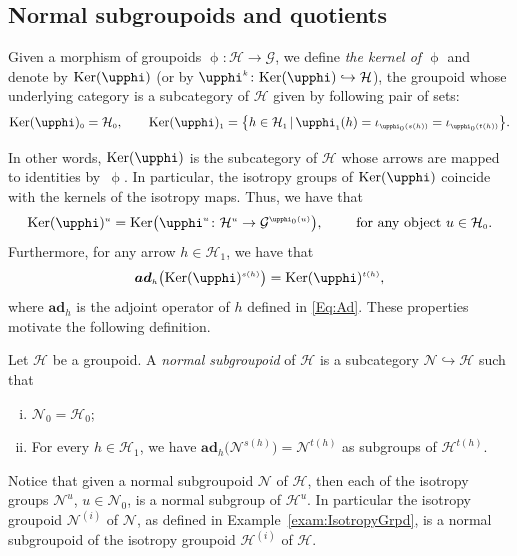 \documentclass[10pt,a4paper]{amsart}
\numberwithin{equation}{section}
\newcommand{\bd}[1]{\boldsymbol{#1}}
\newcommand{\Ho}{\cH_{\Sscript{0}}}
\newcommand{\Ha}{\cH_{\Sscript{1}}}
\newcommand{\No}{\cN_{\Sscript{0}}}
\newcommand{\Ker}[1]{{\rm Ker}(#1)}
\newcommand{\Ad}[1]{{\bd{ad}}_{\Sscript{#1}}}
\newcommand{\cG}{{\mathcal G}}
\newcommand{\cH}{{\mathcal H}}
\newcommand{\cN}{{\mathcal N}}
\newcommand{\Sscript}[1]{\scriptscriptstyle{#1}}
\newcommand{\phia}{\upphi_{\Sscript{1}}}
\begin{document}
\subsection{Normal subgroupoids and quotients}\label{ssec:normal}
Given a morphism of groupoids $\upphi\colon \cH \to \cG$, we define \emph{the kernel of $\upphi$} and denote by $\Ker{\upphi}$ (or by $\upphi^{\Sscript{k}}\colon \Ker{\upphi} \hookrightarrow \cH$), the groupoid whose underlying category is a subcategory of $\cH$ given by following pair of sets:
\begin{gather*}
\Ker{\upphi}_{\Sscript{0}}=\Ho,\qquad \Ker{\upphi}_{\Sscript{1}}=\big\{ h \in \Ha\,|\, \phia(h)=\iota_{\Sscript{ \upphi_0( s(h))}}= \iota_{\Sscript{\upphi_0( t(h))}}\big\}.
\end{gather*}

In other words, $\Ker{\upphi}$ is the subcategory of $\cH$ whose arrows are mapped to identities by~$\upphi$. In particular, the isotropy groups of $\Ker{\upphi}$ coincide with the kernels of the isotropy maps. Thus, we have that
\begin{gather*}
\Ker{\upphi}^{\Sscript{u}}= {\rm Ker}\big(\upphi^{\Sscript{u}}\colon \cH^{\Sscript{u}} \to \cG^{\Sscript{\upphi_{\Sscript{0}}(u)}} \big),\qquad \text{ for any object } u \in \Ho.
\end{gather*}
Furthermore, for any arrow $h \in \Ha$, we have that
\begin{gather*}
\Ad{h}\big( \Ker{\upphi}^{\Sscript{s(h)}} \big) = \Ker{\upphi}^{\Sscript{t(h)}},
\end{gather*}
where $\Ad{h}$ is the adjoint operator of $h$ defined in \eqref{Eq:Ad}. These properties motivate the following definition.
\begin{Definition}\label{def:Normal}Let $\cH$ be a groupoid. A \emph{normal subgroupoid} of $\cH$ is a subcategory $\cN \hookrightarrow \cH$ such that
\begin{enumerate}[(i)]
\item $\cN_{\Sscript{0}} =\cH_{\Sscript{0}}$;
\item For every $h \in \Ha$, we have $\Ad{h}\big(\cN^{\Sscript{s(h)}}\big) = \cN^{\Sscript{t(h)}} $ as subgroups of $\cH^{\Sscript{t(h)}}$.
\end{enumerate}
\end{Definition}
Notice that given a normal subgroupoid $\cN$ of $\cH$, then each of the isotropy groups $\cN^{\Sscript{u}}$, $u \in \No$, is a normal subgroup of $\cH^{\Sscript{u}}$. In particular the isotropy groupoid $\cN^{\Sscript{(i)}}$ of $\cN$, as defined in Example~\ref{exam:IsotropyGrpd}, is a normal subgroupoid of the isotropy groupoid $\cH^{\Sscript{(i)}}$ of $\cH$.
\end{document}
